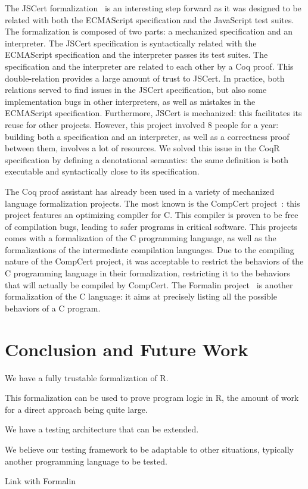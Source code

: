 \documentclass[
    sigplan,
    10pt,
    review, %
    natbib=false %
 ]{acmart}
\begin{document}
The JSCert formalization~\parencite{jscert, popl14jscert}
is an interesting step forward as it was designed
to be related with both the ECMAScript specification and the JavaScript test suites.
The formalization is composed of two parts:
a mechanized specification and an interpreter.
The JSCert specification is syntactically related with the ECMAScript specification
and the interpreter passes its test suites.
The specification and the interpreter are related to each other by a Coq proof.
This double-relation provides a large amount of trust to JSCert.
In practice, both relations served to find issues in the JSCert specification,
but also some implementation bugs in other interpreters,
as well as mistakes in the ECMAScript specification.
Furthermore, JSCert is mechanized:
this facilitates its reuse for other projects.
However, this project involved 8 people for a year:
building both a specification and an interpreter,
as well as a correctness proof between them, involves a lot of resources.
We solved this issue in the CoqR specification
by defining a denotational semantics:
the same definition is both executable and syntactically close to its specification.

The Coq proof assistant has already been used
in a variety of mechanized language formalization projects.
The most known is the CompCert project~\cite{Leroy-Compcert-CACM}:
this project features an optimizing compiler for C.
This compiler is proven to be free of compilation bugs,
leading to safer programs in critical software.
This projects comes with a formalization of the C programming language,
as well as the formalizations of the intermediate compilation languages.
%
Due to the compiling nature of the CompCert project,
it was acceptable to restrict the behaviors of the C programming language
in their formalization,
restricting it to the behaviors that will actually be compiled by CompCert.
The Formalin project~\parencite{formalin} is another formalization
of the C language:
it aims at precisely listing all the possible behaviors of a C program.

\section{Conclusion and Future Work}
\label{sec:conclusion}

We have a fully trustable formalization of R.

This formalization can be used to prove program logic in R,
the amount of work for a direct approach being quite large.

We have a testing architecture that can be extended.

We believe our testing framework to be adaptable to other situations,
typically another programming language to be tested.

Link with Formalin

\printbibliography{}
\end{document}
